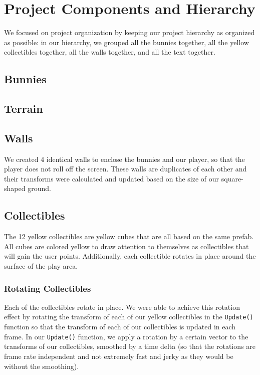 \documentclass[12pt]{article}
\begin{document}
\section{Project Components and Hierarchy}
  We focused on project organization by keeping our project hierarchy as organized as possible: in our hierarchy, we grouped all the bunnies together, all the yellow collectibles together, all the walls together, and all the text together.

\subsection{Bunnies}

\subsection{Terrain}

\subsection{Walls}
  We created 4 identical walls to enclose the bunnies and our player, so that the player does not roll off the screen. These walls are duplicates of each other and their transforms were calculated and updated based on the size of our square-shaped ground.

\subsection{Collectibles}
  The 12 yellow collectibles are yellow cubes that are all based on the same prefab. All cubes are colored yellow to draw attention to themselves as collectibles that will gain the user points. Additionally, each collectible rotates in place around the surface of the play area.

\subsubsection{Rotating Collectibles}
  Each of the collectibles rotate in place. We were able to achieve this rotation effect by rotating the transform of each of our yellow collectibles in the \verb+Update()+ function so that the transform of each of our collectibles is updated in each frame. In our \verb+Update()+ function, we apply a rotation by a certain vector to the transforms of our collectibles, smoothed by a time delta (so that the rotations are frame rate independent and not extremely fast and jerky as they would be without the smoothing).
\end{document}
